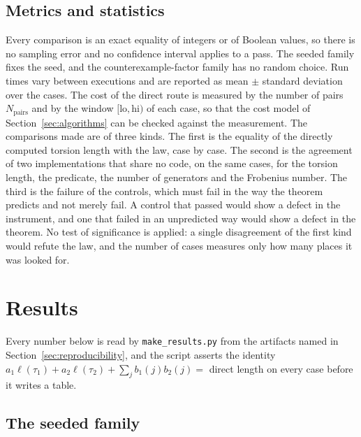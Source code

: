 \documentclass[11pt]{article}
\theoremstyle{definition}
\theoremstyle{remark}
\newcommand{\tor}{\tau}
\newcommand{\len}{\ell}
\begin{document}
\subsection{Metrics and statistics}

Every comparison is an exact equality of integers or of Boolean values, so there is no sampling error and no confidence interval
applies to a pass. The seeded family fixes the seed, and the counterexample-factor family has no random choice. Run times vary between executions and are
reported as mean $\pm$ standard deviation over the cases. The cost of the direct route is measured by the number of pairs $N_{\mathrm{pairs}}$ and by the
window $[\mathrm{lo},\mathrm{hi})$ of each case, so that the cost model of Section~\ref{sec:algorithms} can be checked against the measurement.
The comparisons made are of three kinds. The first is the equality of the directly computed torsion length with the law, case by case. The second is the agreement of two implementations that
share no code, on the same cases, for the torsion length, the predicate, the number of generators and the Frobenius number. The third is the failure of the controls, which must fail in the way the theorem
predicts and not merely fail. A control that passed would show a defect in the instrument, and one that failed in an unpredicted way would show a defect in the theorem.
No test of significance is applied: a single disagreement of the first kind would refute the law, and the number of cases measures only how many places it was looked for.

\section{Results}\label{sec:results}

Every number below is read by \texttt{make\_results.py} from the artifacts named in Section~\ref{sec:reproducibility}, and the script asserts the
identity $a_1\len(\tor_1)+a_2\len(\tor_2)+\sum_jb_1(j)b_2(j)=$ direct length on every case before it writes a table.

\subsection{The seeded family}
\end{document}
